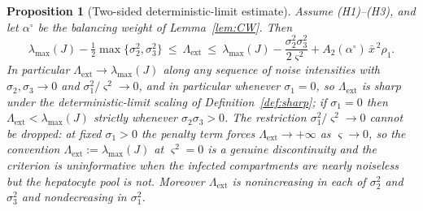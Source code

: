 \documentclass{article}
\newtheorem{proposition}{Proposition}[section]
\newcommand{\Lext}{\Lambda_{\mathrm{ext}}}
\begin{document}
\begin{proposition}[Two-sided deterministic-limit estimate]\label{prop:detlimit}
Assume (H1)--(H3), and let $\alpha^\circ$ be the balancing weight of Lemma~\ref{lem:CW}. Then
\begin{equation}\label{eq:sandwich}
\lambda_{\max}(J)-\tfrac12\max\{\sigma_2^2,\sigma_3^2\}\ \le\ \Lext\ \le\ \lambda_{\max}(J)-\frac{\sigma_2^2\sigma_3^2}{2\varsigma^2}+A_2(\alpha^\circ)\,\bar x^{\,2}\rho_1 .
\end{equation}
In particular $\Lext\to\lambda_{\max}(J)$ along any sequence of noise intensities with $\sigma_2,\sigma_3\to0$ and $\sigma_1^2/\varsigma^2\to0$, and in particular whenever $\sigma_1=0$, so $\Lext$ is sharp under the deterministic-limit scaling of Definition~\ref{def:sharp}; if $\sigma_1=0$ then $\Lext<\lambda_{\max}(J)$ strictly whenever $\sigma_2\sigma_3>0$. The restriction $\sigma_1^2/\varsigma^2\to0$ cannot be dropped: at fixed $\sigma_1>0$ the penalty term forces $\Lext\to+\infty$ as $\varsigma\to0$, so the convention $\Lext:=\lambda_{\max}(J)$ at $\varsigma^2=0$ is a genuine discontinuity and the criterion is uninformative when the infected compartments are nearly noiseless but the hepatocyte pool is not. Moreover $\Lext$ is nonincreasing in each of $\sigma_2^2$ and $\sigma_3^2$ and nondecreasing in $\sigma_1^2$.
\end{proposition}
\end{document}
